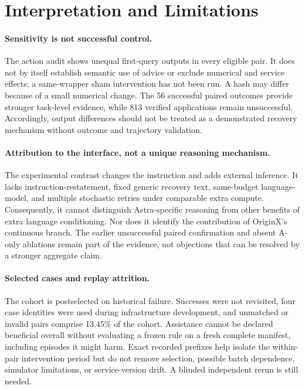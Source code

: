 \documentclass[10pt,twocolumn,letterpaper]{article}
\begin{document}
\section{Interpretation and Limitations}
\label{sec:limits}
\paragraph{Sensitivity is not successful control.}
The action audit shows unequal first-query outputs in every eligible pair. It does not by itself establish semantic use of advice or exclude numerical and service effects; a same-wrapper sham intervention has not been run. A hash may differ because of a small numerical change. The 56 successful paired outcomes provide stronger task-level evidence, while 813 verified applications remain unsuccessful. Accordingly, output differences should not be treated as a demonstrated recovery mechanism without outcome and trajectory validation.

\paragraph{Attribution to the interface, not a unique reasoning mechanism.}
The experimental contrast changes the instruction and adds external inference. It lacks instruction-restatement, fixed generic recovery text, same-budget language-model, and multiple stochastic retries under comparable extra compute. Consequently, it cannot distinguish Astra-specific reasoning from other benefits of extra language conditioning. Nor does it identify the contribution of OriginX's continuous branch. The earlier unsuccessful paired confirmation and absent A-only ablations remain part of the evidence, not objections that can be resolved by a stronger aggregate claim.

\paragraph{Selected cases and replay attrition.}
The cohort is postselected on historical failure. Successes were not revisited, four case identities were used during infrastructure development, and unmatched or invalid pairs comprise 13.45\% of the cohort. Assistance cannot be declared beneficial overall without evaluating a frozen rule on a fresh complete manifest, including episodes it might harm. Exact recorded prefixes help isolate the within-pair intervention period but do not remove selection, possible batch dependence, simulator limitations, or service-version drift. A blinded independent rerun is still needed.
\end{document}
